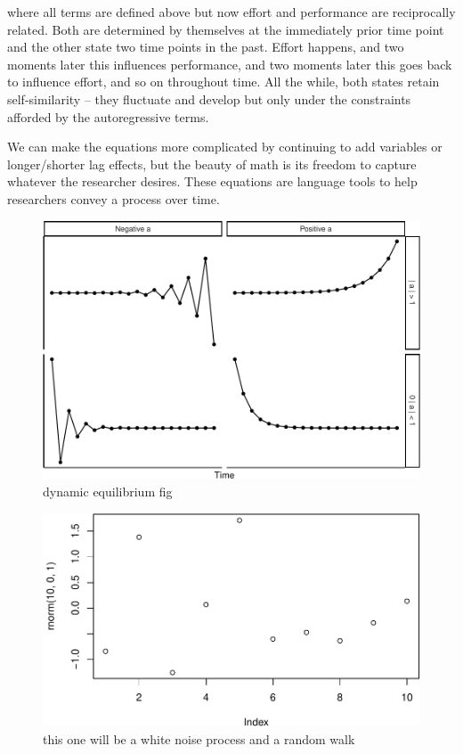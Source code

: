 \documentclass[english,,man]{apa6}
\theoremstyle{definition}
\theoremstyle{definition}
\theoremstyle{definition}
\theoremstyle{remark}
\begin{document}
\noindent where all terms are defined above but now effort and
performance are reciprocally related. Both are determined by themselves
at the immediately prior time point and the other state two time points
in the past. Effort happens, and two moments later this influences
performance, and two moments later this goes back to influence effort,
and so on throughout time. All the while, both states retain
self-similarity -- they fluctuate and develop but only under the
constraints afforded by the autoregressive terms.

We can make the equations more complicated by continuing to add
variables or longer/shorter lag effects, but the beauty of math is its
freedom to capture whatever the researcher desires. These equations are
language tools to help researchers convey a process over time.

\begin{figure}
\centering
\includegraphics{figs/unnamed-chunk-9-1.pdf}
\caption{\label{fig:unnamed-chunk-9}dynamic equilibrium
fig\label{dynamics_plot}}
\end{figure}

\begin{figure}
\centering
\includegraphics{figs/unnamed-chunk-10-1.pdf}
\caption{\label{fig:unnamed-chunk-10}this one will be a white noise process
and a random walk\label{noise}}
\end{figure}
\end{document}
